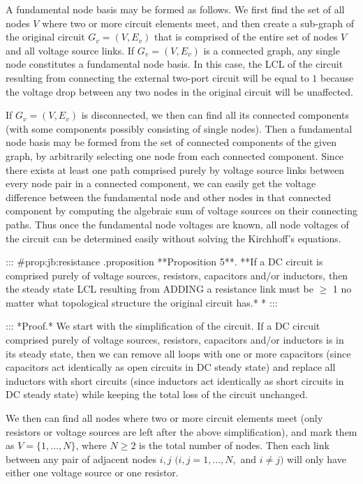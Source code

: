 A fundamental node basis may be formed as follows. We first find the set of all nodes $V$ where two or more circuit elements meet, and then create a sub-graph of the original circuit $G_v=(V,E_v)$ that is comprised of the entire set of nodes $V$ and all voltage source links. If $G_v=(V,E_v)$ is a connected graph, any single node constitutes a fundamental node basis. In this case, the LCL of the circuit resulting from connecting the external two-port circuit will be equal to $1$ because the voltage drop between any two nodes in the original circuit will be unaffected.

If $G_v=(V,E_v)$ is disconnected, we then can find all its connected components (with some components possibly consisting of single nodes). Then a fundamental node basis may be formed from the set of connected components of the given graph, by arbitrarily selecting one node from each connected component. Since there exists at least one path comprised purely by voltage source links between every node pair in a connected component, we can easily get the voltage difference between the fundamental node and other nodes in that connected component by computing the algebraic sum of voltage sources on their connecting paths. Thus once the fundamental node voltages are known, all node voltages of the circuit can be determined easily without solving the Kirchhoff's equations.

::: {#prop:jb:resistance .proposition} **Proposition 5**. **If a DC circuit is comprised purely of voltage sources, resistors, capacitors and/or inductors, then the steady state LCL resulting from ADDING a resistance link must be $\geq$ 1 no matter what topological structure the original circuit has.* * :::

::: *Proof.* We start with the simplification of the circuit. If a DC circuit comprised purely of voltage sources, resistors, capacitors and/or inductors is in its steady state, then we can remove all loops with one or more capacitors (since capacitors act identically as open circuits in DC steady state) and replace all inductors with short circuits (since inductors act identically as short circuits in DC steady state) while keeping the total loss of the circuit unchanged.

We then can find all nodes where two or more circuit elements meet (only resistors or voltage sources are left after the above simplification), and mark them as $V=\{1,...,N\}$, where $N\geq2$ is the total number of nodes. Then each link between any pair of adjacent nodes {$i,j$} $(i,j=1,...,N,$ and $i\neq j)$ will only have either one voltage source or one resistor.

